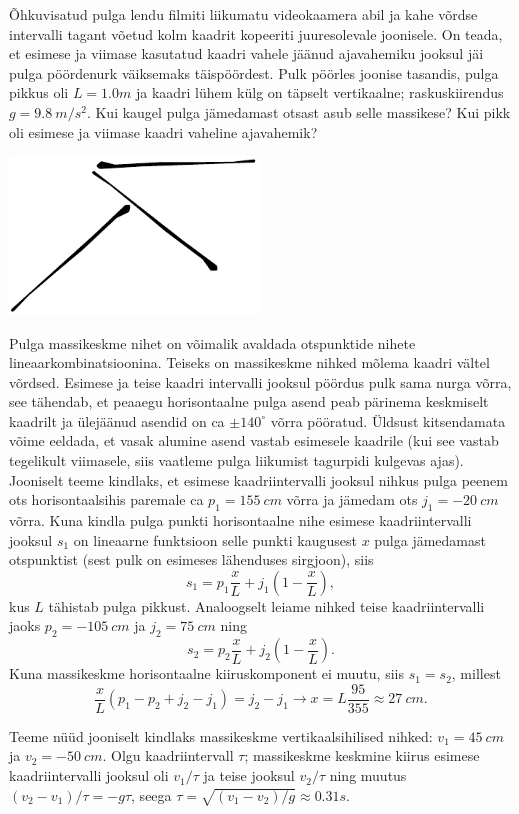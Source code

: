 
Õhkuvisatud pulga lendu filmiti liikumatu videokaamera abil ja kahe võrdse intervalli tagant võetud kolm kaadrit kopeeriti juuresolevale joonisele. On teada, et esimese ja viimase kasutatud kaadri vahele jäänud ajavahemiku jooksul jäi pulga pöördenurk väiksemaks täispöördest. Pulk pöörles joonise tasandis, pulga pikkus oli $L=\SI{1.0}m$ ja kaadri lühem külg on täpselt vertikaalne; raskuskiirendus $g=\SI{9.8}{m/s^2}$. Kui kaugel pulga jämedamast otsast asub selle massikese? Kui pikk oli esimese ja viimase kaadri vaheline ajavahemik?
\begin{center}
	\includegraphics[width = 0.5\textwidth]{2018-lahg-10-yl.pdf}
\end{center}\hint
Pulga massikeskme nihet on võimalik avaldada otspunktide nihete lineaarkombinatsioonina. Teiseks on massikeskme nihked mõlema kaadri vältel võrdsed.\solu
Esimese ja teise kaadri intervalli jooksul pöördus pulk sama nurga võrra, see tähendab, et peaaegu horisontaalne pulga asend peab pärinema keskmiselt kaadrilt ja ülejäänud asendid on ca $\pm 140^\circ$ võrra pööratud. Üldsust kitsendamata võime eeldada, et vasak alumine asend vastab esimesele kaadrile (kui see vastab tegelikult viimasele, siis vaatleme pulga liikumist tagurpidi kulgevas ajas). Jooniselt teeme kindlaks, et esimese kaadriintervalli jooksul nihkus pulga peenem ots horisontaalsihis paremale ca $p_1=\SI{155}{cm}$ võrra ja jämedam ots $j_1=\SI{-20}{cm}$ võrra. Kuna kindla pulga punkti horisontaalne nihe esimese kaadriintervalli jooksul $s_1$ on lineaarne funktsioon selle punkti kaugusest $x$ pulga jämedamast otspunktist (sest pulk on esimeses lähenduses sirgjoon), siis 
\[
s_1=p_1\frac xL+j_1\left(1-\frac xL\right),
\]
kus $L$ tähistab pulga pikkust. Analoogselt leiame nihked teise kaadriintervalli jaoks $p_2=\SI{-105}{cm}$ ja $j_2=\SI{75}{cm}$ ning
\[
s_2=p_2\frac xL+j_2\left(1-\frac xL\right).
\]
Kuna massikeskme horisontaalne kiiruskomponent ei muutu, siis $s_1=s_2$, millest
\[
\frac xL(p_1-p_2+j_2-j_1)=j_2-j_1 \rightarrow x=L\frac{95}{355}\approx \SI{27}{cm}.
\]

Teeme nüüd jooniselt kindlaks massikeskme vertikaalsihilised nihked: $v_1=\SI{45}{cm}$ ja $v_2=\SI{-50}{cm}$.
Olgu kaadriintervall $\tau$; massikeskme keskmine kiirus esimese kaadriintervalli jooksul oli $v_1/\tau$ ja teise jooksul $v_2/\tau$ ning muutus $(v_2-v_1)/\tau= -g\tau$, seega $\tau=\sqrt{(v_1-v_2)/g}\approx \SI{0.31}s$.\probend